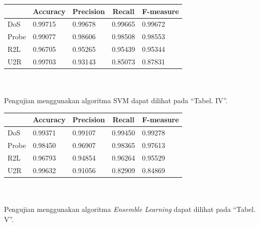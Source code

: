 \documentclass[conference]{IEEEtran}
\begin{document}
\noindent \begin{minipage}{\linewidth}
\begin{center}
\begin{tabular}{|l|l|l|l|l|}
\hline
\multicolumn{1}{|c|}{\textbf{}}&\multicolumn{1}{|c|}{\textbf{Accuracy}}&\multicolumn{1}{|c|}{\textbf{Precision}}&\multicolumn{1}{|c|}{\textbf{Recall}}&\multicolumn{1}{|c|}{\textbf{F-measure}} \\
\hline
DoS & 0.99715 & 0.99678 & 0.99665 & 0.99672\\
\hline
Probe & 0.99077 & 0.98606 & 0.98508 & 0.98553\\
\hline
R2L & 0.96705 & 0.95265 & 0.95439 & 0.95344\\
\hline
U2R & 0.99703 & 0.93143 & 0.85073 & 0.87831\\
\hline
\end{tabular}
\label{tab3}
\end{center}
\end{minipage}\\ \\

\noindent Pengujian menggunakan algoritma SVM dapat dilihat pada ``Tabel. IV''.

\noindent \begin{minipage}{\linewidth}
\begin{center}
\begin{tabular}{|l|l|l|l|l|}
\hline
\multicolumn{1}{|c|}{\textbf{}}&\multicolumn{1}{|c|}{\textbf{Accuracy}}&\multicolumn{1}{|c|}{\textbf{Precision}}&\multicolumn{1}{|c|}{\textbf{Recall}}&\multicolumn{1}{|c|}{\textbf{F-measure}} \\
\hline
DoS & 0.99371 & 0.99107 & 0.99450 & 0.99278\\
\hline
Probe & 0.98450 & 0.96907 & 0.98365 & 0.97613\\
\hline
R2L & 0.96793 & 0.94854 & 0.96264 & 0.95529\\
\hline
U2R & 0.99632 & 0.91056 & 0.82909 & 0.84869\\
\hline
\end{tabular}
\label{tab4}
\end{center}
\end{minipage}\\ \\

\noindent Pengujian menggunakan algoritma \emph{Ensemble Learning} dapat dilihat pada ``Tabel. V''.\vspace{6pt}
\end{document}
